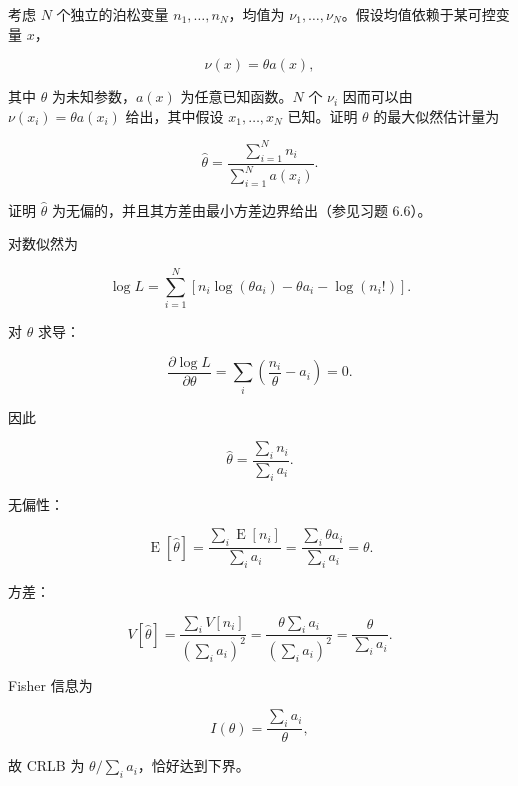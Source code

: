 \begin{question}
考虑 \(N\) 个独立的泊松变量 \(n_1,\ldots,n_N\)，均值为
\(\nu_1,\ldots,\nu_N\)。假设均值依赖于某可控变量 \(x\)，

\[
\nu(x)=\theta a(x),
\]

其中 \(\theta\) 为未知参数，\(a(x)\) 为任意已知函数。\(N\) 个 \(\nu_i\)
因而可以由 \(\nu(x_i)=\theta a(x_i)\) 给出，其中假设 \(x_1,\ldots,x_N\)
已知。证明 \(\theta\) 的最大似然估计量为

\[
\hat\theta=\frac{\sum_{i=1}^{N}n_i}{\sum_{i=1}^{N}a(x_i)}.
\]

证明 \(\hat\theta\) 为无偏的，并且其方差由最小方差边界给出（参见习题
6.6）。
\begin{solution}
对数似然为

\[
\log L=\sum_{i=1}^N\left[n_i\log(\theta a_i)-\theta a_i-\log(n_i!)\right].
\]

对 \(\theta\) 求导：

\[
\frac{\partial\log L}{\partial\theta}=
\sum_i\left(\frac{n_i}{\theta}-a_i\right)=0.
\]

因此

\[
\hat\theta=\frac{\sum_i n_i}{\sum_i a_i}.
\]

无偏性：

\[
\operatorname{E}[\hat\theta]=\frac{\sum_i \operatorname{E}[n_i]}{\sum_i a_i}
=\frac{\sum_i \theta a_i}{\sum_i a_i}=\theta.
\]

方差：

\[
V[\hat\theta]=\frac{\sum_i V[n_i]}{(\sum_i a_i)^2}
=\frac{\theta\sum_i a_i}{(\sum_i a_i)^2}
=\frac{\theta}{\sum_i a_i}.
\]

Fisher 信息为

\[
I(\theta)=\frac{\sum_i a_i}{\theta},
\]

故 CRLB 为 \(\theta/\sum_i a_i\)，恰好达到下界。
\end{solution}
\end{question}



